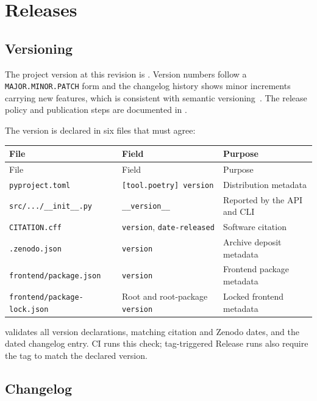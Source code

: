 
\chapter{Releases}
\label{ch:releases}

\section{Versioning}

The project version at this revision is \texttt{\projectversion}. Version
numbers follow a \texttt{MAJOR.MINOR.PATCH} form and the changelog history
shows minor increments carrying new features, which is consistent with
semantic versioning~\cite{semver}. The release policy and publication steps are
documented in .

The version is declared in six files that must agree:

\begin{longtable}{p{} p{} p{}}
\toprule
File & Field & Purpose \\
\midrule
\endfirsthead
\toprule
File & Field & Purpose \\
\midrule
\endhead
\bottomrule
\endlastfoot
\texttt{pyproject.toml} & \texttt{[tool.poetry] version} & Distribution metadata \\
\texttt{src/.../\_\_init\_\_.py} & \texttt{\_\_version\_\_} & Reported by the API and CLI \\
\texttt{CITATION.cff} & \texttt{version}, \texttt{date-released} & Software citation \\
\texttt{.zenodo.json} & \texttt{version} & Archive deposit metadata \\
\texttt{frontend/package.json} & \texttt{version} & Frontend package metadata \\
\texttt{frontend/package-lock.json} & Root and root-package \texttt{version} & Locked frontend metadata \\
\end{longtable}

 validates all version declarations, matching
citation and Zenodo dates, and the dated changelog entry. CI runs this check;
tag-triggered Release runs also require the tag to match the declared version.

\section{Changelog}

